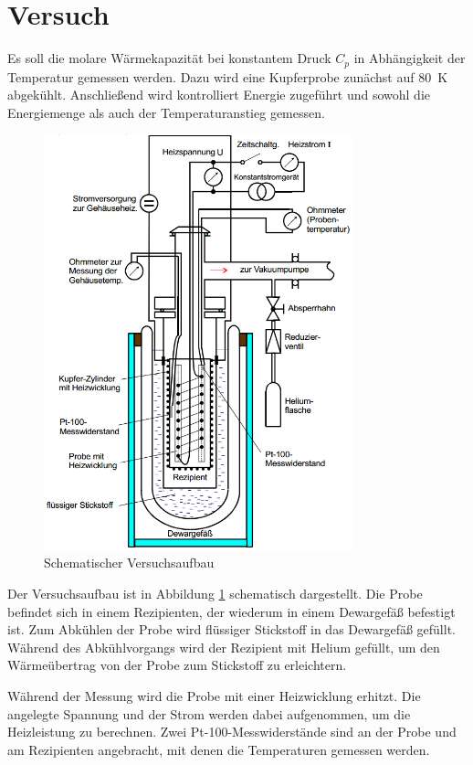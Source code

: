 \section{Versuch}

Es soll die molare Wärmekapazität bei konstantem Druck $C_p$ in Abhängigkeit der Temperatur gemessen werden.
Dazu wird eine Kupferprobe zunächst auf \SI{80}{\kelvin} abgekühlt.
Anschließend wird kontrolliert Energie zugeführt und sowohl die Energiemenge als auch der Temperaturanstieg gemessen.

\begin{figure}
	\centering
	\includegraphics[width=0.8\textwidth]{img/aufbau.png}
	\caption{Schematischer Versuchsaufbau \cite{v47}}
	\label{fig:aufbau}
\end{figure}

Der Versuchsaufbau ist in Abbildung \ref{fig:aufbau} schematisch dargestellt.
Die Probe befindet sich in einem Rezipienten, der wiederum in einem Dewargefäß befestigt ist.
Zum Abkühlen der Probe wird flüssiger Stickstoff in das Dewargefäß gefüllt.
Während des Abkühlvorgangs wird der Rezipient mit Helium gefüllt, um den Wärmeübertrag von der Probe zum Stickstoff zu erleichtern.

Während der Messung wird die Probe mit einer Heizwicklung erhitzt.
Die angelegte Spannung und der Strom werden dabei aufgenommen, um die Heizleistung zu berechnen.
Zwei Pt-100-Messwiderstände sind an der Probe und am Rezipienten angebracht, mit denen die Temperaturen gemessen werden.

